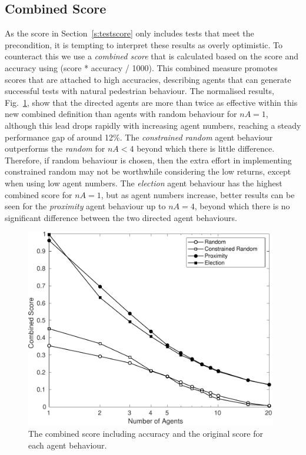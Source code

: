 \documentclass[runningheads,a4paper]{llncs}
\begin{document}
\subsection{Combined Score}
As the score in Section~\ref{s:testscore} only includes tests that meet the precondition, it is tempting to interpret these results as overly optimistic. To counteract this we use a \textit{combined score} that is calculated based on the score and accuracy using (score * accuracy / 1000). This combined measure promotes scores that are attached to high accuracies, describing agents that can generate successful tests with natural pedestrian behaviour. The normalised results, Fig.~\ref{f:combined}, show that the directed agents are more than twice as effective within this new combined definition than agents with random behaviour for $nA=1$, although this lead drops rapidly with increasing agent numbers, reaching a steady performance gap of around 12\%. The \textit{constrained random} agent behaviour outperforms the \textit{random} for $nA<4$ beyond which there is little difference. Therefore, if random behaviour is chosen, then the extra effort in implementing constrained random may not be worthwhile considering the low returns, except when using low agent numbers. The \textit{election} agent behaviour has the highest combined score for $nA=1$, but as agent numbers increase, better results can be seen for the \textit{proximity} agent behaviour up to $nA=4$, beyond which there is no significant difference between the two directed agent behaviours.

\begin{figure}[!t]
	\centering
\includegraphics[width=0.98\textwidth]{Combined.pdf}
	\caption{The combined score including accuracy and the original score for each agent behaviour.}
	\label{f:combined}
\end{figure}
\end{document}
